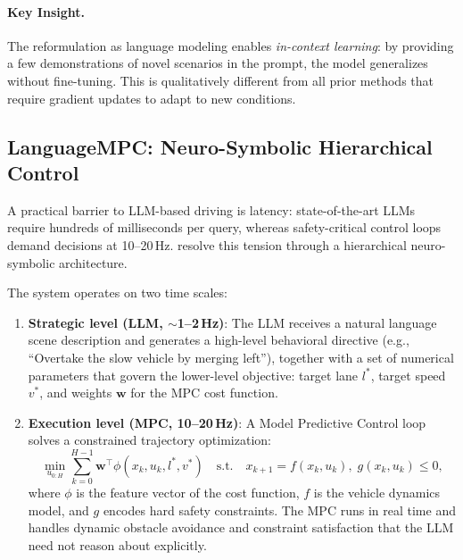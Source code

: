 \documentclass[12pt, a4paper]{article}
\begin{document}
\paragraph{Key Insight.}
The reformulation as language modeling enables \emph{in-context learning}: by
providing a few demonstrations of novel scenarios in the prompt, the model
generalizes without fine-tuning. This is qualitatively different from all
prior methods that require gradient updates to adapt to new conditions.

\subsection{LanguageMPC: Neuro-Symbolic Hierarchical Control}
\label{sec:lmpc}

A practical barrier to LLM-based driving is latency: state-of-the-art LLMs
require hundreds of milliseconds per query, whereas safety-critical control
loops demand decisions at 10--20\,Hz. \citet{sha2023languagempc} resolve this
tension through a hierarchical neuro-symbolic architecture.

The system operates on two time scales:
\begin{enumerate}
  \item \textbf{Strategic level (LLM, $\sim$1--2\,Hz)}: The LLM receives a
        natural language scene description and generates a high-level behavioral
        directive (e.g., ``Overtake the slow vehicle by merging left''), together
        with a set of numerical parameters that govern the lower-level objective:
        target lane $l^*$, target speed $v^*$, and weights $\mathbf{w}$ for the
        MPC cost function.
  \item \textbf{Execution level (MPC, 10--20\,Hz)}: A Model Predictive Control
        loop solves a constrained trajectory optimization:
        \begin{equation}
          \min_{u_{0:H}}
          \sum_{k=0}^{H-1} \mathbf{w}^\top \phi(x_k, u_k, l^*, v^*)
          \quad \text{s.t.} \quad x_{k+1} = f(x_k, u_k),\;
          g(x_k, u_k) \leq 0,
          \label{eq:mpc}
        \end{equation}
        where $\phi$ is the feature vector of the cost function, $f$ is the
        vehicle dynamics model, and $g$ encodes hard safety constraints. The MPC
        runs in real time and handles dynamic obstacle avoidance and constraint
        satisfaction that the LLM need not reason about explicitly.
\end{enumerate}
\end{document}
